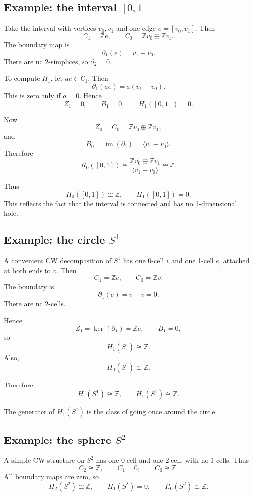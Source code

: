 \documentclass[12pt,a4paper]{article}
\theoremstyle{notespace}
\begin{document}
\subsection{Example: the interval \([0,1]\)}

Take the interval with vertices \(v_0,v_1\) and one edge \(e=[v_0,v_1]\). Then
\[
C_1=\mathbb{Z}e,
\qquad
C_0=\mathbb{Z}v_0\oplus \mathbb{Z}v_1.
\]
The boundary map is
\[
\partial_1(e)=v_1-v_0.
\]
There are no 2-simplices, so \(\partial_2=0\).

To compute \(H_1\), let \(ae\in C_1\). Then
\[
\partial_1(ae)=a(v_1-v_0).
\]
This is zero only if \(a=0\). Hence
\[
Z_1=0,
\qquad
B_1=0,
\qquad
H_1([0,1])=0.
\]

Now
\[
Z_0=C_0=\mathbb{Z}v_0\oplus \mathbb{Z}v_1,
\]
and
\[
B_0=\operatorname{im}(\partial_1)=\langle v_1-v_0\rangle.
\]
Therefore
\[
H_0([0,1])
\cong
\frac{\mathbb{Z}v_0\oplus \mathbb{Z}v_1}{\langle v_1-v_0\rangle}
\cong
\mathbb{Z}.
\]

Thus
\[
H_0([0,1])\cong \mathbb{Z},
\qquad
H_1([0,1])=0.
\]
This reflects the fact that the interval is connected and has no 1-dimensional hole.

\subsection{Example: the circle \(S^1\)}

A convenient CW decomposition of \(S^1\) has one 0-cell \(v\) and one 1-cell \(e\), attached at both ends to \(v\). Then
\[
C_1=\mathbb{Z}e,
\qquad
C_0=\mathbb{Z}v.
\]
The boundary is
\[
\partial_1(e)=v-v=0.
\]
There are no 2-cells.

Hence
\[
Z_1=\ker(\partial_1)=\mathbb{Z}e,
\qquad
B_1=0,
\]
so
\[
H_1(S^1)\cong \mathbb{Z}.
\]
Also,
\[
H_0(S^1)\cong \mathbb{Z}.
\]

Therefore
\[
H_0(S^1)\cong \mathbb{Z},
\qquad
H_1(S^1)\cong \mathbb{Z}.
\]

The generator of \(H_1(S^1)\) is the class of going once around the circle.

\subsection{Example: the sphere \(S^2\)}

A simple CW structure on \(S^2\) has one 0-cell and one 2-cell, with no 1-cells. Thus
\[
C_2\cong \mathbb{Z},
\qquad
C_1=0,
\qquad
C_0\cong \mathbb{Z}.
\]
All boundary maps are zero, so
\[
H_2(S^2)\cong \mathbb{Z},
\qquad
H_1(S^2)=0,
\qquad
H_0(S^2)\cong \mathbb{Z}.
\]
\end{document}
